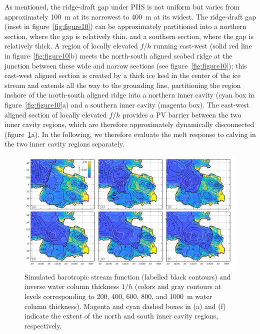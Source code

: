 \documentclass[draft]{agujournal2019}
\begin{document}
As mentioned, the ridge-draft gap under PIIS is not uniform but varies from approximately 100~m at its narrowest to 400~m at its widest.  The ridge-draft gap (inset in figure~\ref{fig:figure10}) can be approximately partitioned into a northern section, where the gap is relatively thin, and a southern section, where the gap is relatively thick. A region of locally elevated $f/h$ running east-west (solid red line in figure~\ref{fig:figure10}b) meets the north-south aligned seabed ridge at the junction between these wide and narrow sections (see figure~\ref{fig:figure10}); this east-west aligned section is created by a thick ice keel in the center of the ice stream and extends all the way to the grounding line, partitioning the region inshore of the north-south aligned ridge into a northern inner cavity (cyan box in figure~\ref{fig:figure10}a) and a southern inner cavity (magenta box). The east-west aligned section of locally elevated $f/h$  provides a PV barrier between the two inner cavity regions, which are therefore approximately dynamically disconnected (figure~\ref{fig:figure11}a). In the following, we therefore evaluate the melt response to calving in the two inner cavity regions separately.

\begin{figure}
    \centering
    \includegraphics[width = \textwidth]{../make_figures/plots/figure11.pdf}
    \caption{Simulated barotropic stream function (labelled black contours) and inverse water column thickness $1/h$ (colors and gray contours at levels corresponding to 200, 400, 600, 800, and 1000~m water column thickness). Magenta and cyan dashed boxes in (a) and (f) indicate the extent of the north and south inner cavity regions, respectively.}
    \label{fig:figure11}
\end{figure}
\end{document}
